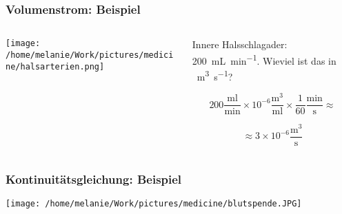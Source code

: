 \documentclass{beamer}
\begin{document}
\begin{frame}
\frametitle{Volumenstrom: Beispiel}

\begin{columns}[c]
\begin{column}{5cm}

\begin{center}
\texttt{[image: /home/melanie/Work/pictures/medicine/halsarterien.png]}
\end{center}


\end{column}

\begin{column}{5cm}

Innere Halsschlagader: \SI{200}{\milli\liter\per\minute}. Wieviel ist das in \SI{}{\cubic\meter\per\second}?

\pause

\[
200 \frac{\text{ml}}{\text{min}} \times 10^{-6} \frac{\text{m}^3}{\text{ml}} \times \frac{1}{60} \frac{\text{min}}{\text{s}} \approx
\]

\[
\approx 3\times 10^{-6} \frac{\text{m}^3}{\text{s}}
\]

\end{column}



\end{columns}

\end{frame}



\begin{frame}
\end{frame}


\begin{frame}
\frametitle{Kontinuitätsgleichung: Beispiel}
\begin{center}
\texttt{[image: /home/melanie/Work/pictures/medicine/blutspende.JPG]}
\end{center}
\end{frame}


\begin{frame}
\end{frame}
\end{document}
